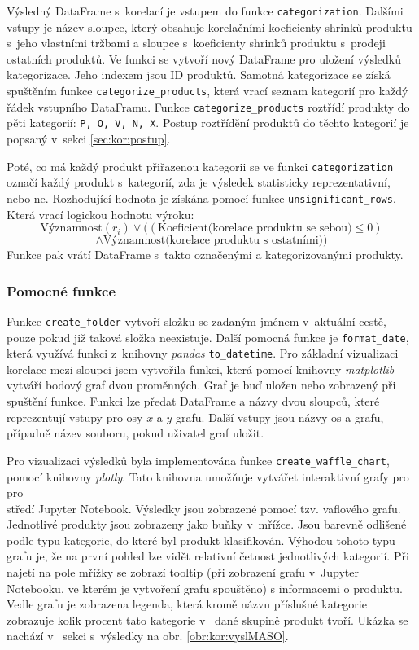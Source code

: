 Výsledný DataFrame s~korelací je vstupem do funkce \texttt{categorization}.  Dalšími vstupy je název sloupce, který obsahuje korelačními koeficienty shrinků produktu s~jeho vlastními tržbami a sloupce s~koeficienty shrinků produktu s~prodeji ostatních produktů. Ve funkci se vytvoří nový DataFrame pro uložení výsledků kategorizace. Jeho indexem jsou ID produktů. Samotná kategorizace se získá spuštěním funkce \texttt{categorize\_products}, která vrací seznam kategorií pro každý řádek vstupního DataFramu. Funkce \texttt{categorize\_products} roztřídí produkty do pěti kategorií: \texttt{P, O, V, N, X}. Postup roztřídění produktů do těchto kategorií je popsaný v~sekci \ref{sec:kor:postup}.

Poté, co má každý produkt přiřazenou kategorii se ve funkci \texttt{categorization} označí každý produkt s~kategorií, zda je výsledek statisticky reprezentativní, nebo ne. Rozhodující hodnota je získána pomocí funkce \texttt{unsignificant\_rows}. Která vrací logickou hodnotu výroku:
$$ \mbox{Významnost}(r_i) \lor ( (\mbox{Koeficient(korelace produktu se sebou)} \leq 0) $$ 
$$ \land  \mbox{Významnost(korelace produktu s~ostatními)} ) $$
Funkce pak vrátí DataFrame s~takto označenými a kategorizovanými produkty.

\subsubsection*{Pomocné funkce}

Funkce \texttt{create\_folder} vytvoří složku se zadaným jménem v~aktuální cestě, pouze pokud již taková složka neexistuje. Další pomocná funkce je \texttt{format\_date}, která využívá funkci z~knihovny \emph{pandas} \texttt{to\_datetime}. 
Pro základní vizualizaci korelace mezi sloupci jsem vytvořila funkci, která pomocí knihovny \emph{matplotlib} vytváří bodový graf dvou proměnných. Graf je buď uložen nebo zobrazený při spuštění funkce. Funkci lze předat DataFrame a názvy dvou sloupců, které reprezentují vstupy pro osy $x$ a $y$ grafu. Další vstupy jsou názvy os a grafu, případně název souboru, pokud uživatel graf uložit.

Pro vizualizaci výsledků byla implementována funkce \texttt{create\_waffle\_chart}, pomocí knihovny \emph{plotly}. Tato knihovna umožňuje vytvářet interaktivní grafy pro pro-\\ středí Jupyter Notebook. Výsledky jsou zobrazené pomocí tzv. vaflového grafu. Jednotlivé produkty jsou zobrazeny jako buňky v~mřížce. Jsou barevně odlišené podle   typu kategorie, do které byl produkt klasifikován. Výhodou tohoto typu grafu je, že na první pohled lze vidět relativní četnost jednotlivých kategorií. Při najetí na pole mřížky se zobrazí tooltip (při zobrazení grafu v~Jupyter Notebooku, ve kterém je vytvoření grafu spouštěno) s informacemi o produktu. Vedle grafu je zobrazena legenda, která kromě názvu příslušné kategorie zobrazuje kolik procent tato kategorie v~ dané skupině produkt tvoří. Ukázka se nachází v~ sekci s~výsledky na obr. \ref*{obr:kor:vyslMASO}.

